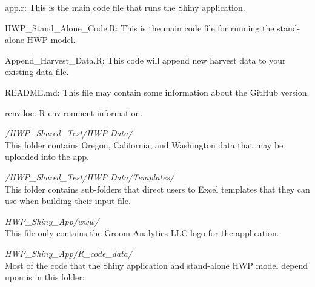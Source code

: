 \documentclass[
]{book}
\begin{document}
app.r: This is the main code file that runs the Shiny application.

HWP\_Stand\_Alone\_Code.R: This is the main code file for running the stand-alone HWP model.

Append\_Harvest\_Data.R: This code will append new harvest data to your existing data file.

README.md: This file may contain some information about the GitHub version.

renv.loc: R environment information.

\emph{/HWP\_Shared\_Test/HWP Data/}\\
This folder contains Oregon, California, and Washington data that may be uploaded into the app.

\emph{/HWP\_Shared\_Test/HWP Data/Templates/}\\
This folder contains sub-folders that direct users to Excel templates that they can use when building their input file.

\emph{HWP\_Shiny\_App/www/}\\
This file only contains the Groom Analytics LLC logo for the application.

\emph{HWP\_Shiny\_App/R\_code\_data/}\\
Most of the code that the Shiny application and stand-alone HWP model depend upon is in this folder:
\end{document}
